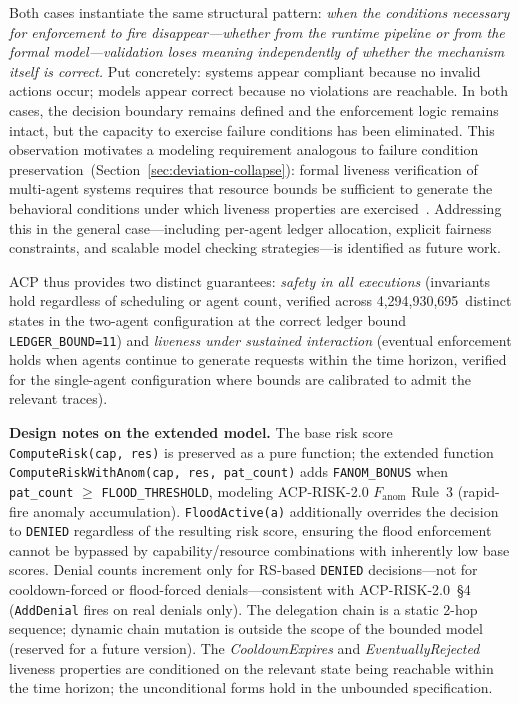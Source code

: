 \documentclass[11pt]{article}
\theoremstyle{definition}
\begin{document}
Both cases instantiate the same structural pattern: \emph{when the conditions
necessary for enforcement to fire disappear---whether from the runtime pipeline
or from the formal model---validation loses meaning independently of whether
the mechanism itself is correct.}
Put concretely: systems appear compliant because no invalid actions occur;
models appear correct because no violations are reachable.
In both cases, the decision boundary remains defined and the enforcement
logic remains intact, but the capacity to exercise failure conditions has
been eliminated.
This observation motivates a modeling requirement analogous to failure condition
preservation~(Section~\ref{sec:deviation-collapse}):
formal liveness verification of multi-agent systems requires that resource bounds
be sufficient to generate the behavioral conditions under which liveness properties
are exercised~\cite{yu1999model, lamport2002specifying}.
Addressing this in the general case---including per-agent ledger allocation,
explicit fairness constraints, and scalable model checking strategies---is
identified as future work.

ACP thus provides two distinct guarantees: \emph{safety in all executions}
(invariants hold regardless of scheduling or agent count, verified across
4,294,930,695~distinct states in the two-agent configuration at the correct
ledger bound \texttt{LEDGER\_BOUND=11}) and \emph{liveness under sustained
interaction} (eventual enforcement holds when agents continue to generate
requests within the time horizon, verified for the single-agent configuration
where bounds are calibrated to admit the relevant traces).

\noindent\textbf{Design notes on the extended model.}
The base risk score \texttt{ComputeRisk(cap,\,res)} is preserved as a pure function;
the extended function \texttt{ComputeRiskWithAnom(cap,\,res,\,pat\_count)} adds
\texttt{FANOM\_BONUS} when \texttt{pat\_count} $\geq$ \texttt{FLOOD\_THRESHOLD},
modeling ACP-RISK-2.0 $F_{\text{anom}}$ Rule~3 (rapid-fire anomaly accumulation).
\texttt{FloodActive(a)} additionally overrides the decision to \texttt{DENIED} regardless
of the resulting risk score, ensuring the flood enforcement cannot be bypassed by
capability/resource combinations with inherently low base scores.
Denial counts increment only for RS-based \texttt{DENIED} decisions---not for cooldown-forced
or flood-forced denials---consistent with ACP-RISK-2.0~\S4 (\texttt{AddDenial} fires on
real denials only).
The delegation chain is a static 2-hop sequence; dynamic chain mutation is outside the
scope of the bounded model (reserved for a future version).
The \textit{CooldownExpires} and \textit{EventuallyRejected} liveness properties are
conditioned on the relevant state being reachable within the time horizon; the
unconditional forms hold in the unbounded specification.
\end{document}
